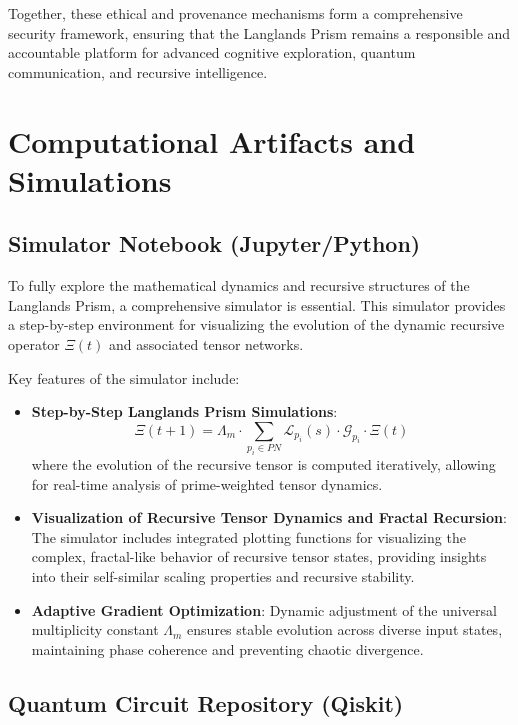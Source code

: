 \documentclass[11pt]{article}
\begin{document}
Together, these ethical and provenance mechanisms form a comprehensive security framework, ensuring that the Langlands Prism remains a responsible and accountable platform for advanced cognitive exploration, quantum communication, and recursive intelligence.

\section{Computational Artifacts and Simulations}

\subsection{Simulator Notebook (Jupyter/Python)}

To fully explore the mathematical dynamics and recursive structures of the Langlands Prism, a comprehensive simulator is essential. This simulator provides a step-by-step environment for visualizing the evolution of the dynamic recursive operator \(\Xi(t)\) and associated tensor networks.

Key features of the simulator include:

\begin{itemize}
    \item \textbf{Step-by-Step Langlands Prism Simulations}:
    \[
    \Xi(t+1) = \Lambda_m \cdot \sum_{p_i \in PN} \mathcal{L}_{p_i}(s) \cdot \mathcal{G}_{p_i} \cdot \Xi(t)
    \]
    where the evolution of the recursive tensor is computed iteratively, allowing for real-time analysis of prime-weighted tensor dynamics.

    \item \textbf{Visualization of Recursive Tensor Dynamics and Fractal Recursion}:
    The simulator includes integrated plotting functions for visualizing the complex, fractal-like behavior of recursive tensor states, providing insights into their self-similar scaling properties and recursive stability.
    
    \item \textbf{Adaptive Gradient Optimization}:
    Dynamic adjustment of the universal multiplicity constant \(\Lambda_m\) ensures stable evolution across diverse input states, maintaining phase coherence and preventing chaotic divergence.
\end{itemize}

\subsection{Quantum Circuit Repository (Qiskit)}
\end{document}
